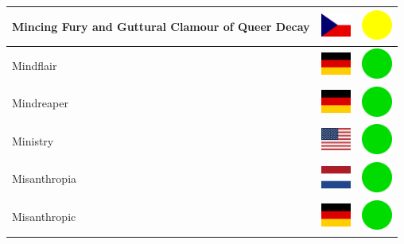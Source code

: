 \documentclass[12pt, a4paper, twoside]{report}
\begin{document}
\begin{center}
\begin{longtable}{|p{5cm}|p{2cm}|p{2cm}|}
 Mincing Fury and Guttural Clamour of Queer Decay           & \includegraphics[width=1cm]{../img/flags/cz} &   \includegraphics[width=1cm]{../likes/m} \\ \hline
 Mindflair                                                  & \includegraphics[width=1cm]{../img/flags/de} &   \includegraphics[width=1cm]{../likes/y} \\ \hline
 Mindreaper                                                 & \includegraphics[width=1cm]{../img/flags/de} &   \includegraphics[width=1cm]{../likes/y} \\ \hline
 Ministry                                                   & \includegraphics[width=1cm]{../img/flags/us} &   \includegraphics[width=1cm]{../likes/y} \\ \hline
 Misanthropia                                               & \includegraphics[width=1cm]{../img/flags/nl} &   \includegraphics[width=1cm]{../likes/y} \\ \hline
 Misanthropic                                               & \includegraphics[width=1cm]{../img/flags/de} &   \includegraphics[width=1cm]{../likes/y} \\ \hline

\end{longtable}
\end{center}
\end{document}
